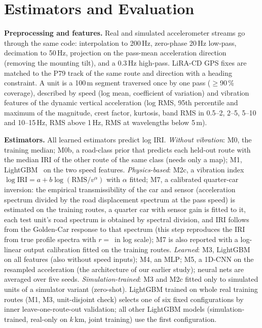 \section{Estimators and Evaluation}
\label{sec:method}

\textbf{Preprocessing and features.}
Real and simulated accelerometer streams go through the same code: interpolation to 200\,Hz, zero-phase 20\,Hz low-pass, decimation to 50\,Hz, projection on the pass-mean acceleration direction (removing the mounting tilt), and a 0.3\,Hz high-pass.
LiRA-CD GPS fixes are matched to the P79 track of the same route and direction with a heading constraint.
A unit is a 100\,m segment traversed once by one pass ($\ge$90\,\% coverage), described by speed (log mean, coefficient of variation) and vibration features of the dynamic vertical acceleration (log RMS, 95th percentile and maximum of the magnitude, crest factor, kurtosis, band RMS in 0.5--2, 2--5, 5--10 and 10--15\,Hz, RMS above 1\,Hz, RMS at wavelengths below 5\,m).

\textbf{Estimators.}
All learned estimators predict log IRI.
\emph{Without vibration}: M0, the training median; M0b, a road-class prior that predicts each held-out route with the median IRI of the other route of the same class (needs only a map); M1, LightGBM~\cite{ke2017lightgbm} on the two speed features.
\emph{Physics-based}: M2c, a vibration index $\log \mathrm{IRI} = a + b \log(\mathrm{RMS}/v^{\alpha})$ with $\alpha$ fitted; M7, a calibrated quarter-car inversion: the empirical transmissibility of the car and sensor (acceleration spectrum divided by the road displacement spectrum at the pass speed) is estimated on the training routes, a quarter car with sensor gain is fitted to it, each test unit's road spectrum is obtained by spectral division, and IRI follows from the Golden-Car response to that spectrum (this step reproduces the IRI from true profile spectra with $r=$\,\invCheckR{} in log scale); M7 is also reported with a log-linear output calibration fitted on the training routes.
\emph{Learned}: M3, LightGBM on all features (also without speed inputs); M4, an MLP; M5, a 1D-CNN on the resampled acceleration (the architecture of our earlier study); neural nets are averaged over five seeds.
\emph{Simulation-trained}: M3 and M2c fitted only to simulated units of a simulator variant (zero-shot). LightGBM trained on whole real training routes (M1, M3, unit-disjoint check) selects one of six fixed configurations by inner leave-one-route-out validation; all other LightGBM models (simulation-trained, real-only on $k$\,km, joint training) use the first configuration.

